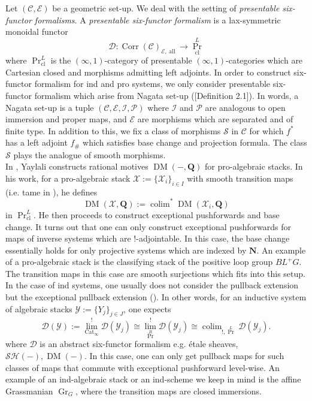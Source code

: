 \documentclass[14pt]{article}
\theoremstyle{definition}
\newcommand{\E}{\mathcal{E}}
\newcommand{\D}{\mathcal{D}}
\renewcommand{\P}{\mathcal{P}}
\newcommand{\op}[1]{\operatorname{#1}}
\renewcommand{\S}{\mathcal{S}}
\newcommand{\I}{\mathscr{I}}
\newcommand{\Ca}{\mathcal{C}}
\newcommand{\X}{\mathcal{X}}
\numberwithin{subsection}{section}
\newcommand{\SH}{\mathcal{SH}}
\newcommand{\Y}{\mathcal{Y}}
\begin{document}
Let $(\Ca,\E)$ be a geometric set-up. We deal with the setting of \textit{presentable six-functor formalisms}. A \textit{presentable six-functor formalism} is a  lax-symmetric monoidal functor 
\begin{equation}
    \D : \op{Corr}(\Ca)_{\E,\op{all}} \to \op{Pr}^L_{\op{cl}}
\end{equation} 
 where $\op{Pr}^L_{\op{cl}}$ is the $(\infty,1)$-category of presentable $(\infty,1)$-categories which are Cartesian closed and morphisms admitting left adjoints. 
In order to construct six-functor formalism for ind and pro systems, we only consider presentable six-functor formalism which arise from Nagata set-up (\cite{dauser2025uniquenesssixfunctorformalisms}[Definition 2.1]). In words, a Nagata set-up is a tuple $(\Ca,\E,\I,\P)$ where $\I$ and $\P$ are analogous to open immersion and proper maps, and $\E$ are morphisms which are separated and of finite type. In addition to this, we fix a class of morphisms $\S$ in $\Ca$ for which $f^*$ has a left adjoint $f_{\#}$ which satisfies base change and projection formula. The class $\S$ plays the analogue of smooth morphisms.\\


In \cite{yaylali2025rationalmotivesproalgebraicstacks}, Yaylali constructs rational motives $\op{DM}(-,\mathbf{Q})$ for  pro-algebraic stacks. In his work, for a pro-algebraic stack $\X:=\{ \X_i\}_{i \in I}$ with smooth transition maps (i.e. tame in \cite{yaylali2025rationalmotivesproalgebraicstacks}), he defines
\begin{equation}
    \op{DM}(\X,\mathbf{Q}):= \op{colim}^* \op{DM}(\X_i,\mathbf{Q})
\end{equation}
in $\op{Pr}^L_{\op{cl}}$. He then proceeds to construct exceptional pushforwards and base change. It turns out that one can only construct exceptional pushforwards for maps of inverse systems which are $!$-adjointable. In this case, the base change essentially holds for only projective systems which are indexed by $\mathbf{N}$. An example of a pro-algebraic stack is the classifying stack of the positive loop group $BL^+G$. The transition maps in this case are smooth surjections which fits into this setup.\\

In the case of ind systems, one usually does not consider the pullback extension but the exceptional pullback extension (\cite[Section 2.2]{Richarz_2021}). In other words, for an inductive system of algebraic stacks $\Y:= \{Y_j\}_{j \in J}$, one expects 
\begin{equation}
    \D(\Y):= \op{lim}_{\op{Cat}_{\infty}}^! \D(\Y_j) \cong \op{lim}^!_{\op{Pr}^R}\D(\Y_j)   \cong \op{colim}_{!,\op{Pr}^L} \D(\Y_j).
\end{equation}
where $\D$ is an abstract six-functor formalism  e.g. \'etale sheaves, $\SH(-), \op{DM}(-)$. In this case, one can only get pullback maps for such classes of maps that commute with exceptional pushforward level-wise.  An example of an ind-algebraic stack or an ind-scheme we keep in mind is the affine Grassmanian $\op{Gr}_G$, where the transition maps are closed immersions.  \\
\end{document}
